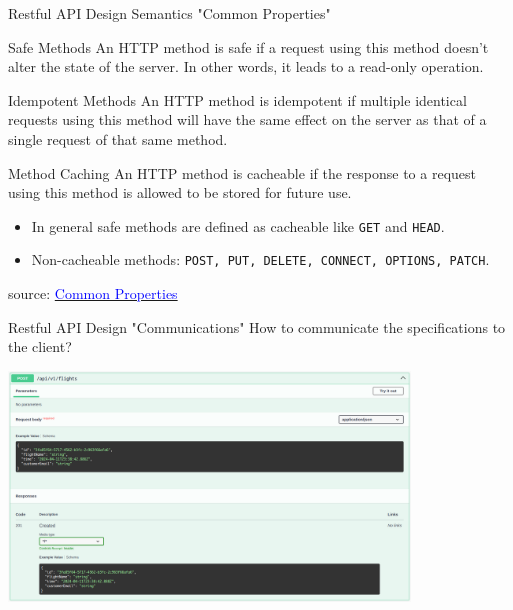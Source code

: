 \documentclass{beamer}
\newcommand{\code}[1]{\colorbox{codegray}{\texttt{#1}}}
\begin{document}
\begin{frame}[t]{Restful API Design Semantics "Common Properties"}
	\scriptsize
	\begin{block}{Safe Methods}		
		An HTTP method is safe if a request using this method doesn’t alter the state of the server. In other words, it leads to a read-only operation.	
	\end{block}
		
	\begin{block}{Idempotent Methods}	
		An HTTP method is idempotent if multiple identical requests using this method will have the same effect on the server as that of a single request of that same method.
	\end{block}
	
	\begin{block}{Method Caching}
		An HTTP method is cacheable if the response to a request using this method is allowed to be stored for future use. 
		\begin{itemize}
			\item In general safe methods are defined as cacheable like \code{GET} and \code{HEAD}.
			\item Non-cacheable methods: \code{POST, PUT, DELETE, CONNECT, OPTIONS, PATCH}.
		\end{itemize}			
		
	\end{block}
	
	\vspace{10mm}
	\tiny source: \href{https://learning.mlytics.com/the-internet/http-request-methods} {\textcolor{blue}{Common Properties}} 
\end{frame}

\begin{frame}[t]{Restful API Design "Communications"}
		\scriptsize	
		How to communicate the specifications to the client?

		\begin{center}
   			\includegraphics[width=0.8\textwidth, height=0.6\textheight]{img/swagger-doc.png}
		\end{center}		
	
\end{frame}
\end{document}
